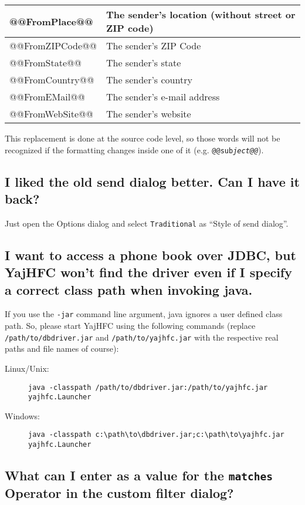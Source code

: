 \documentclass[a4paper,10pt]{scrartcl}
\begin{document}
\begin{center}
\begin{tabular}{|l|p{}|}
\ttfamily @@FromPlace@@ & The sender's  location (without street or ZIP code)\\\hline
\ttfamily @@FromZIPCode@@ & The sender's  ZIP Code \\\hline
\ttfamily @@FromState@@ & The sender's  state\\\hline
\ttfamily @@FromCountry@@ & The sender's  country\\\hline
\ttfamily @@FromEMail@@ & The sender's  e-mail address\\\hline
\ttfamily @@FromWebSite@@ & The sender's website\\\hline
\end{tabular}
\end{center}

This replacement is done at the source code level, so those words will not be recognized if the formatting changes inside one of it (e.g. \texttt{@@sub\textit{ject@@}}).

\subsection{I liked the old send dialog better. Can I have it back?}

Just open the Options dialog and select \texttt{Traditional} as ``Style of send dialog''.

\subsection{I want to access a phone book over JDBC, but YajHFC won't find the driver even if I specify a correct class path when invoking java.}

If you use the \texttt{-jar} command line argument, java ignores a user defined class path.
So, please start YajHFC using the following commands (replace \texttt{/path/to/dbdriver.jar} and \texttt{/path/to/yajhfc.jar} with the respective real paths and file names of course):
\begin{description}
\item [Linux/Unix:] \verb#java -classpath /path/to/dbdriver.jar:/path/to/yajhfc.jar yajhfc.Launcher#
\item [Windows:] \verb#java -classpath c:\path\to\dbdriver.jar;c:\path\to\yajhfc.jar yajhfc.Launcher#
\end{description}

\subsection{What can I enter as a value for the \texttt{matches} Operator in the custom filter dialog?}
\end{document}
